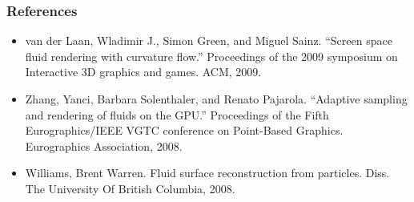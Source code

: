 \documentclass{beamer}
\begin{document}
	\begin{frame}[t]\frametitle{References}
	    \begin{itemize}
	    	\item van der Laan, Wladimir J., Simon Green, and Miguel Sainz. ``Screen space fluid rendering with curvature flow.'' Proceedings of the 2009 symposium on Interactive 3D graphics and games. ACM, 2009.
	    	\item Zhang, Yanci, Barbara Solenthaler, and Renato Pajarola. ``Adaptive sampling and rendering of fluids on the GPU.'' Proceedings of the Fifth Eurographics/IEEE VGTC conference on Point-Based Graphics. Eurographics Association, 2008.
	    	\item Williams, Brent Warren. Fluid surface reconstruction from particles. Diss. The University Of British Columbia, 2008.
	    \end{itemize}
	\end{frame}
\end{document}
